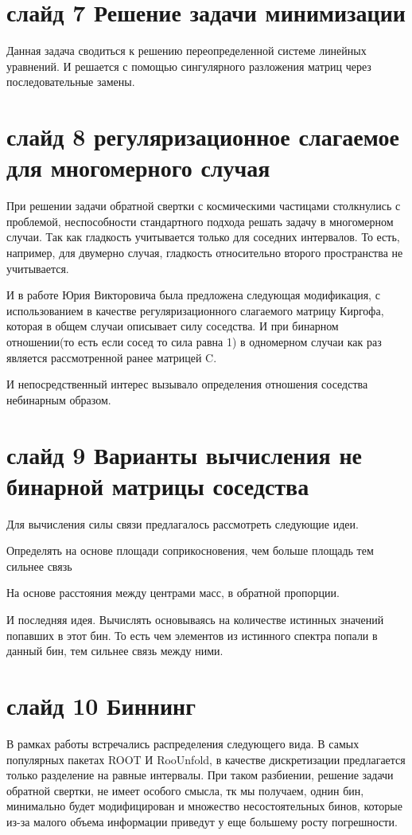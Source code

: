 \documentclass[a4paper,12pt]{diplom}
\begin{document}
\section*{слайд 7 Решение задачи минимизации}
Данная задача сводиться к решению переопределенной системе линейных уравнений. И решается с помощью сингулярного разложения матриц 
через последовательные замены.

\section*{слайд 8 регуляризационное слагаемое для многомерного случая}
При решении задачи обратной свертки с космическими частицами столкнулись с проблемой, неспособности стандартного подхода решать задачу в многомерном 
случаи. Так как гладкость учитывается только для соседних интервалов. То есть, например, для двумерно случая, гладкость относительно 
второго пространства не учитывается.

И в работе Юрия Викторовича была предложена следующая модификация, с использованием в качестве регуляризационного слагаемого матрицу Киргофа, 
которая в общем случаи описывает силу соседства. И при бинарном отношении(то есть если сосед то сила равна 1) в одномерном случаи как раз
является рассмотренной ранее матрицей C. 

И непосредственный интерес вызывало определения отношения соседства небинарным образом.


\section*{слайд 9 Варианты вычисления не бинарной матрицы соседства}
Для вычисления силы связи предлагалось рассмотреть следующие идеи. 

Определять на основе площади соприкосновения, чем больше площадь тем сильнее связь 

На основе расстояния между центрами масс, в обратной пропорции.

И последняя идея. Вычислять основываясь на количестве истинных значений попавших в этот бин. То есть чем элементов из истинного спектра 
попали в данный бин, тем сильнее связь между ними.


\section*{слайд 10 Биннинг}
В рамках работы встречались распределения следующего вида. В самых популярных пакетах ROOT И RooUnfold, в качестве дискретизации 
предлагается только разделение на равные интервалы. При таком разбиении, решение задачи обратной свертки, не имеет особого смысла, 
тк мы получаем, однин бин, минимально будет модифицирован и множество несостоятельных бинов, которые из-за малого объема информации 
приведут у еще большему росту погрешности.
\end{document}
